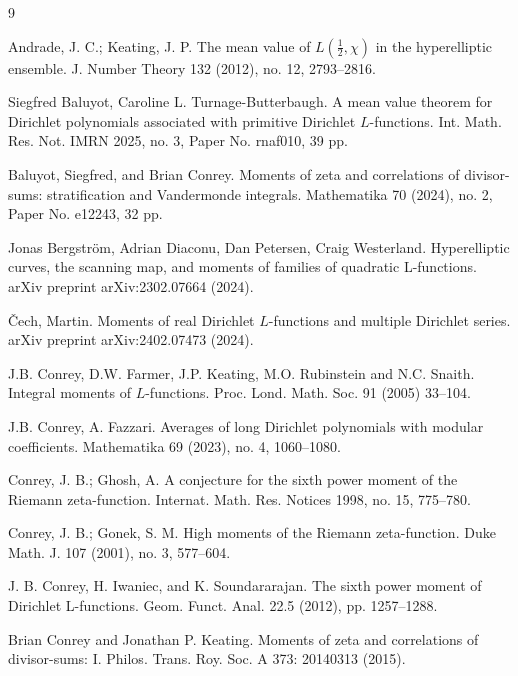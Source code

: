 \documentclass[12pt]{amsart}
\begin{document}
	
	\begin{thebibliography}{9}
		
		 Andrade, J. C.; Keating, J. P. The mean value of $L(\frac12,\chi)$ in the hyperelliptic ensemble. J. Number Theory 132 (2012), no. 12, 2793--2816.
		
		 Siegfred Baluyot, Caroline L. Turnage-Butterbaugh. A mean value theorem for Dirichlet polynomials associated with primitive Dirichlet $L$-functions. Int. Math. Res. Not. IMRN 2025, no. 3, Paper No. rnaf010, 39 pp.
		
		 Baluyot, Siegfred, and Brian Conrey. Moments of zeta and correlations of divisor-sums: stratification and Vandermonde integrals. Mathematika 70 (2024), no. 2, Paper No. e12243, 32 pp.
		
		 Jonas Bergström, Adrian Diaconu, Dan Petersen, Craig Westerland. Hyperelliptic curves, the scanning map, and moments of families of quadratic L-functions. arXiv preprint arXiv:2302.07664 (2024).
		
		 \v{C}ech, Martin. Moments of real Dirichlet $L$-functions and multiple Dirichlet series. arXiv preprint arXiv:2402.07473 (2024).
		
		
		 J.B. Conrey, D.W. Farmer,
		J.P. Keating, M.O. Rubinstein and N.C. Snaith.  Integral
		moments of $L$-functions. Proc. Lond. Math. Soc. 91 (2005)
		33--104.
		
		 J.B. Conrey, A. Fazzari. Averages of long Dirichlet polynomials with modular coefficients. Mathematika 69 (2023), no. 4, 1060--1080.
		
		
		
		 Conrey, J. B.; Ghosh, A. A conjecture for the sixth power moment of the Riemann zeta-function. Internat. Math. Res. Notices 1998, no. 15, 775--780.
		
		 Conrey, J. B.; Gonek, S. M. High moments of the Riemann zeta-function. Duke Math. J. 107 (2001), no. 3, 577--604.
		
		 J. B. Conrey, H. Iwaniec, and K. Soundararajan. The sixth power moment of
		Dirichlet L-functions. Geom. Funct. Anal. 22.5 (2012), pp. 1257–1288.
		
		 Brian Conrey and Jonathan P. Keating. Moments of zeta and correlations of divisor-sums: I. Philos.
		Trans. Roy. Soc. A 373: 20140313 (2015).
		

\end{thebibliography}
\end{document}

